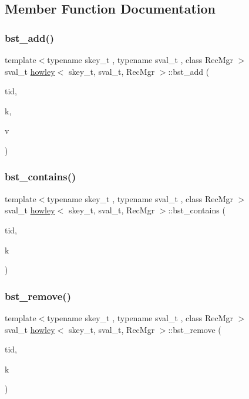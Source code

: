 \subsection{Member Function Documentation}
\mbox{\label{classhowley_a2c3298e68329401c0ba27bf50a11f624}} 
\subsubsection{\texorpdfstring{bst\+\_\+add()}{bst\_add()}}
{\footnotesize\ttfamily template$<$typename skey\+\_\+t , typename sval\+\_\+t , class Rec\+Mgr $>$ \\
sval\+\_\+t \hyperlink{classhowley}{howley}$<$ skey\+\_\+t, sval\+\_\+t, Rec\+Mgr $>$\+::bst\+\_\+add (\begin{DoxyParamCaption}\item[{const int}]{tid,  }\item[{skey\+\_\+t}]{k,  }\item[{sval\+\_\+t}]{v }\end{DoxyParamCaption})}

\mbox{\label{classhowley_a42cff4d570c8fda67543525ebc0342e3}} 
\subsubsection{\texorpdfstring{bst\+\_\+contains()}{bst\_contains()}}
{\footnotesize\ttfamily template$<$typename skey\+\_\+t , typename sval\+\_\+t , class Rec\+Mgr $>$ \\
sval\+\_\+t \hyperlink{classhowley}{howley}$<$ skey\+\_\+t, sval\+\_\+t, Rec\+Mgr $>$\+::bst\+\_\+contains (\begin{DoxyParamCaption}\item[{const int}]{tid,  }\item[{skey\+\_\+t}]{k }\end{DoxyParamCaption})}

\mbox{\label{classhowley_a469bbd88967ff50d865bbf368b1eae5e}} 
\subsubsection{\texorpdfstring{bst\+\_\+remove()}{bst\_remove()}}
{\footnotesize\ttfamily template$<$typename skey\+\_\+t , typename sval\+\_\+t , class Rec\+Mgr $>$ \\
sval\+\_\+t \hyperlink{classhowley}{howley}$<$ skey\+\_\+t, sval\+\_\+t, Rec\+Mgr $>$\+::bst\+\_\+remove (\begin{DoxyParamCaption}\item[{const int}]{tid,  }\item[{skey\+\_\+t}]{k }\end{DoxyParamCaption})}

